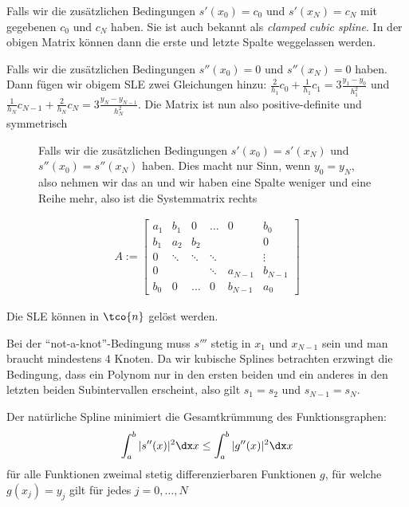  Falls wir die zusätzlichen Bedingungen $s'(x_0) = c_0$ und $s'(x_N) = c_N$ mit gegebenen $c_0$ und $c_N$ haben.
Sie ist auch bekannt als \textit{clamped cubic spline}.
In der obigen Matrix können dann die erste und letzte Spalte weggelassen werden.

 Falls wir die zusätzlichen Bedingungen $s''(x_0) = 0$ und $s''(x_N) = 0$ haben.
Dann fügen wir obigem SLE zwei Gleichungen hinzu: $\frac{2}{h_1} c_0 + \frac{1}{h_1} c_1 = 3 \frac{y_1 - y_0}{h_1^2}$ und $\frac{1}{h_N} c_{N-1} + \frac{2}{h_N} c_N = 3 \frac{y_N - y_{N-1}}{h_N^2}$.
Die Matrix ist nun also positive-definite und symmetrisch

\vspace{-1.25pc}
{
    \begin{figure}
         Falls wir die zusätzlichen Bedingungen $s'(x_0) = s'(x_N)$ und $s''(x_0) = s''(x_N)$ haben.
        Dies macht nur Sinn, wenn $y_0 = y_N$, also nehmen wir das an und wir haben eine Spalte weniger und eine Reihe mehr, also ist die Systemmatrix rechts
    \end{figure}
    \begin{align*}
        A :=
        \begin{bmatrix}
            a_1 & b_1    & 0      & \dots  & 0         & b_0       \\
            b_1 & a_2    & b_2    &        &           & 0         \\
            0   & \ddots & \ddots & \ddots &           & \vdots    \\
            0   &        &        & \ddots & a_{N - 1} & b_{N - 1} \\
            b_0 & 0      & \dots  & 0      & b_{N - 1} & a_0
        \end{bmatrix}
    \end{align*}
}

\inlineremark Die SLE können in $\tco{n}$ gelöst werden.

\inlineremark Bei der ``not-a-knot''-Bedingung muss $s'''$ stetig in $x_1$ und $x_{N - 1}$ sein und man braucht mindestens $4$ Knoten.
Da wir kubische Splines betrachten erzwingt die Bedingung, dass ein Polynom nur in den ersten beiden und ein anderes in den letzten beiden Subintervallen erscheint,
also gilt $s_1 = s_2$ und $s_{N - 1} = s_N$.

\inlineremark Der natürliche Spline minimiert die Gesamtkrümmung des Funktionsgraphen:
\begin{align*}
    \int_{a}^{b} |s''(x)|^2 \dx x \leq \int_{a}^{b} |g''(x)|^2 \dx x
\end{align*}
für alle Funktionen zweimal stetig differenzierbaren Funktionen $g$, für welche $g(x_j) = y_j$ gilt für jedes $j = 0, \ldots, N$

